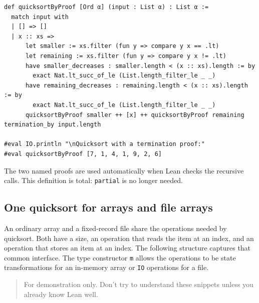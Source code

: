 \documentclass[11pt]{article}
\begin{document}
\begin{verbatim}
def quicksortByProof [Ord α] (input : List α) : List α :=
  match input with
  | [] => []
  | x :: xs =>
      let smaller := xs.filter (fun y => compare y x == .lt)
      let remaining := xs.filter (fun y => compare y x != .lt)
      have smaller_decreases : smaller.length < (x :: xs).length := by
        exact Nat.lt_succ_of_le (List.length_filter_le _ _)
      have remaining_decreases : remaining.length < (x :: xs).length := by
        exact Nat.lt_succ_of_le (List.length_filter_le _ _)
      quicksortByProof smaller ++ [x] ++ quicksortByProof remaining
termination_by input.length

#eval IO.println "\nQuicksort with a termination proof:"
#eval quicksortByProof [7, 1, 4, 1, 9, 2, 6]
\end{verbatim}

The two named proofs are used automatically when Lean checks the recursive
calls.  This definition is total: \texttt{partial} is no longer needed.
\subsection{One quicksort for arrays and file arrays}
\label{sec:org8cdc97f}

An ordinary array and a fixed-record file share the operations needed by
quicksort.  Both have a size, an operation that reads the item at an index, and
an operation that stores an item at an index.  The following structure captures
that common interface.  The type constructor \texttt{m} allows the operations to be
state transformations for an in-memory array or \texttt{IO} operations for a file.

\begin{quote}
For demonstration only. Don't try to understand these snippets unless you
already know Lean well.
\end{quote}
\end{document}
